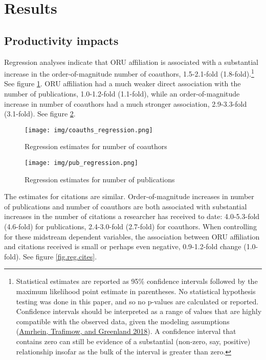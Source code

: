 \documentclass[
  11pt,
]{article}
\begin{document}
\hypertarget{results}{%
\section{Results}\label{results}}

\hypertarget{productivity-impacts-2}{%
\subsection{Productivity impacts}\label{productivity-impacts-2}}

Regression analyses indicate that ORU affiliation is associated with a substantial increase in the order-of-magnitude number of coauthors, 1.5-2.1-fold (1.8-fold).\footnote{Statistical estimates are reported as 95\% confidence intervals followed by the maximum likelihood point estimate in parentheses. No statistical hypothesis testing was done in this paper, and so no p-values are calculated or reported. Confidence intervals should be interpreted as a range of values that are highly compatible with the observed data, given the modeling assumptions (\protect\hyperlink{ref-AmrheinInferentialStatisticsDescriptive2018}{Amrhein, Trafimow, and Greenland 2018}). A confidence interval that contains zero can still be evidence of a substantial (non-zero, say, positive) relationship insofar as the bulk of the interval is greater than zero.} See figure \ref{fig.reg.coauths}. ORU affiliation had a much weaker direct association with the number of publications, 1.0-1.2-fold (1.1-fold), while an order-of-magnitude increase in number of coauthors had a much stronger association, 2.9-3.3-fold (3.1-fold). See figure \ref{fig.reg.pubs}.

\begin{figure}
\centering
\texttt{[image: img/coauths\_regression.png]}
\caption{Regression estimates for number of coauthors \label{fig.reg.coauths}}
\end{figure}

\begin{figure}
\centering
\texttt{[image: img/pub\_regression.png]}
\caption{Regression estimates for number of publications \label{fig.reg.pubs}}
\end{figure}

The estimates for citations are similar. Order-of-magnitude increases in number of publications and number of coauthors are both associated with substantial increases in the number of citations a researcher has received to date: 4.0-5.3-fold (4.6-fold) for publications, 2.4-3.0-fold (2.7-fold) for coauthors. When controlling for these midstream dependent variables, the association between ORU affiliation and citations received is small or perhaps even negative, 0.9-1.2-fold change (1.0-fold). See figure \ref{fig.reg.cites}.
\end{document}

